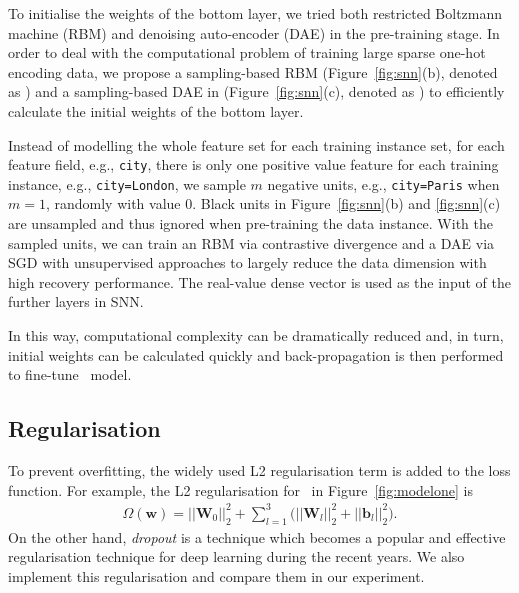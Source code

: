 \documentclass{llncs}
\newcommand{\bs}{\boldsymbol}
\newcommand{\ft}{\texttt}
\newcommand{\fmnn}{\text{FNN}}
\newcommand{\snn}{\text{SNN}}
\newcommand{\snnrbm}{\text{SNN-RBM}}
\newcommand{\snndae}{\text{SNN-DAE}}
\begin{document}
To initialise the weights of the bottom layer, we tried both restricted Boltzmann machine (RBM) \cite{hinton2010practical} and denoising auto-encoder (DAE) \cite{bengio2013generalized} in the pre-training stage. In order to deal with the computational problem of training large sparse one-hot encoding data, we propose a sampling-based RBM (Figure~\ref{fig:snn}(b), denoted as \snnrbm) and a sampling-based DAE in (Figure~\ref{fig:snn}(c), denoted as \snndae) to efficiently calculate the initial weights of the bottom layer.

Instead of modelling the whole feature set for each training instance set, for each feature field, e.g., \ft{city}, there is only one positive value feature for each training instance, e.g., \ft{city=London}, we sample $m$ negative units, e.g., \ft{city=Paris} when $m=1$, randomly with value 0. Black units in Figure~\ref{fig:snn}(b) and \ref{fig:snn}(c) are unsampled and thus ignored when pre-training the data instance. With the sampled units, we can train an RBM via contrastive divergence \cite{hinton2002training} and a DAE via SGD with unsupervised approaches to largely reduce the data dimension with high recovery performance. The real-value dense vector is used as the input of the further layers in SNN.









In this way, computational complexity can be dramatically reduced and, in turn, initial weights can be calculated quickly and back-propagation is then performed to fine-tune \snn~model.


\subsection{Regularisation}\vspace{-2pt}
To prevent overfitting, the widely used L2 regularisation term is added to the loss function. For example, the L2 regularisation for \fmnn~in Figure~\ref{fig:modelone} is
\begin{align}
\Omega(\bs{w})=||\bs{W}_{0}||_2^{2}+\sum_{l=1}^3 \Big( ||\bs{W}_{l}||_2^{2}+||\bs{b}_{l}||_2^{2} \Big). \label{eq:xdefreg}
\end{align}
On the other hand, \emph{dropout} \cite{srivastava2014dropout} is a technique which becomes a popular and effective regularisation technique for deep learning during the recent years. We also implement this regularisation and compare them in our experiment.
\end{document}
